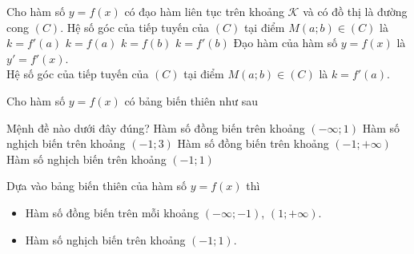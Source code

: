 \begin{ex}%
	Cho hàm số $y=f(x)$ có đạo hàm liên tục trên khoảng $\mathscr{K}$ và có đồ thị là đường cong $(C)$. Hệ số góc của tiếp tuyến của $(C)$ tại điểm $M(a;b)\in (C)$ là
	\choice
	{\True $k=f'(a)$}
	{$k=f(a)$}
	{$k=f(b)$}
	{$k=f'(b)$}
	\loigiai
	{
		Đạo hàm của hàm số $y=f(x)$ là $y'=f'(x)$.\\
		Hệ số góc của tiếp tuyến của $(C)$ tại điểm $M(a;b)\in (C)$ là $k=f'(a)$.
	}
\end{ex}

\begin{ex}%
	Cho hàm số $y=f(x)$ có bảng biến thiên như sau
	\begin{center}
	\end{center}
	Mệnh đề nào dưới đây đúng?
	\choice
	{Hàm số đồng biến trên khoảng $(-\infty;1)$}
	{Hàm số nghịch biến trên khoảng $(-1;3)$}
	{Hàm số đồng biến trên khoảng $(-1;+\infty)$}
	{\True Hàm số nghịch biến trên khoảng $(-1;1)$}
	\loigiai
	{
		Dựa vào bảng biến thiên của hàm số $y=f(x)$ thì
		\begin{itemize}
			\item Hàm số đồng biến trên mỗi khoảng $(-\infty;-1)$, $(1;+\infty)$.
			\item Hàm số nghịch biến trên khoảng $(-1;1)$.
		\end{itemize}
	}
\end{ex}

